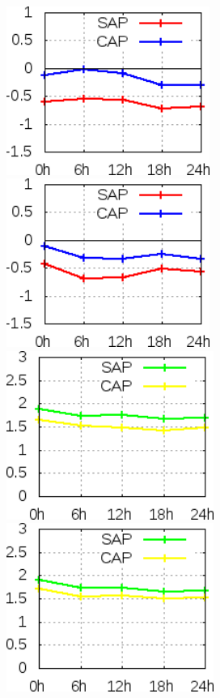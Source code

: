 \begin{figure}[!hbp]
\includegraphics[height=5.5cm]{./figs/VIES500temp0Z.png}\includegraphics[height=5.5cm]{./figs/VIES500temp12Z.png}
\includegraphics[height=5.5cm]{./figs/EQM500temp0Z.png}\includegraphics[height=5.5cm]{./figs/EQM500temp12Z.png}

\end{figure}
